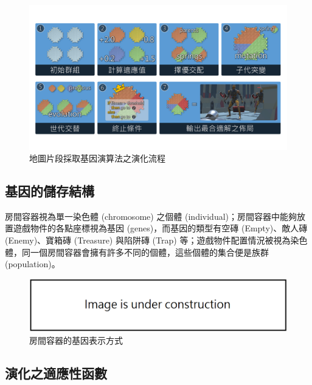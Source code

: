 \begin{figure}[ht]
  \begin{center}
    \includegraphics[width=1.0\textwidth]{figures/segments-with-ga.pdf}
    \caption{地圖片段採取基因演算法之演化流程} 
    \label{fig:segments-with-ga}
  \end{center}
\end{figure}

\subsection{基因的儲存結構}
\label{ssec:method-segments-gene}

房間容器視為單一染色體 (chromosome) 之個體 (individual)；房間容器中能夠放置遊戲物件的各點座標視為基因 (genes)，而基因的類型有空磚 (Empty)、敵人磚 (Enemy)、寶箱磚 (Treasure) 與陷阱磚 (Trap) 等；遊戲物件配置情況被視為染色體，同一個房間容器會擁有許多不同的個體，這些個體的集合便是族群 (population)。

\begin{figure}[ht]
  \begin{center}
    \includegraphics[width=1.0\textwidth]{figures/under_construction.png}
    \caption{房間容器的基因表示方式} 
    \label{fig:segments-gene-example}
  \end{center}
\end{figure}

\subsection{演化之適應性函數}
\label{ssec:method-segments-fitnesses}

